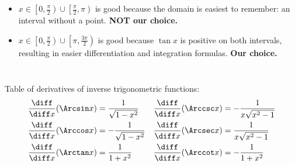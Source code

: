 \begin{frame}
\begin{columns}
\begin{itemize}
\item<6-> $x\in \left[0, \frac{\pi}{2}\right)\cup\left[\frac{\pi}{2}, \pi \right) $ is good because the domain is easiest to remember: an interval without a point. \textbf{NOT our choice.}

\item<7,8,9,10-> $x\in \left[0, \frac{\pi}{2} \right) \cup \left[\pi,\frac{3\pi}{2} \right) $ is  good because $\tan x$ is positive on both intervals, resulting in easier differentiation and integration formulas. \textbf{Our choice.} 

\end{itemize}
\end{columns}

\end{frame}

\begin{frame}
Table of derivatives of inverse trigonometric functions: 
\begin{align*}
\frac{\diff}{\diff x} (\Arcsin x) & = %
\frac{1}{\sqrt{1-x^2}} &%
\frac{\diff}{\diff x} (\Arccsc x) & = %
-\frac{1}{x\sqrt{x^2-1}} \\%
\frac{\diff}{\diff x} (\Arccos x) & = %
-\frac{1}{\sqrt{1-x^2}} &%
\frac{\diff}{\diff x} (\Arcsec x) & = %
\frac{1}{x\sqrt{x^2-1}} \\%
\frac{\diff}{\diff x} (\Arctan x) & = %
\frac{1}{1+x^2} &%
\frac{\diff}{\diff x} (\Arccot x) & = %
-\frac{1}{1+x^2} %
\end{align*}
\end{frame}
